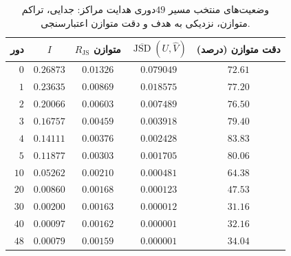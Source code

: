 \begin{table}[htbp]
\centering\small
\caption{وضعیت‌های منتخب مسیر $49$دوری هدایت مراکز: جدایی، تراکم متوازن، نزدیکی به هدف و دقت متوازن اعتبارسنجی.}
\label{tab:ch4-center-trajectory-selected}
\begin{tabular}{rcccc}\hline
دور & $I$ & $R_{\mathrm{JS}}$ متوازن & $\overline{\operatorname{JSD}}(U,\widehat V)$ & دقت متوازن (درصد)\\\hline
$0$ & $0.26873$ & $0.01326$ & $0.079049$ & $72.61$\\
$1$ & $0.23635$ & $0.00869$ & $0.018575$ & $77.20$\\
$2$ & $0.20066$ & $0.00603$ & $0.007489$ & $76.50$\\
$3$ & $0.16757$ & $0.00459$ & $0.003918$ & $79.40$\\
$4$ & $0.14111$ & $0.00376$ & $0.002428$ & $83.83$\\
$5$ & $0.11877$ & $0.00303$ & $0.001705$ & $80.06$\\
$10$ & $0.05262$ & $0.00210$ & $0.000481$ & $64.38$\\
$20$ & $0.00860$ & $0.00168$ & $0.000123$ & $47.53$\\
$30$ & $0.00200$ & $0.00163$ & $0.000012$ & $31.16$\\
$40$ & $0.00097$ & $0.00162$ & $0.000001$ & $32.16$\\
$48$ & $0.00079$ & $0.00159$ & $0.000001$ & $34.04$\\
\hline
\end{tabular}
\end{table}
